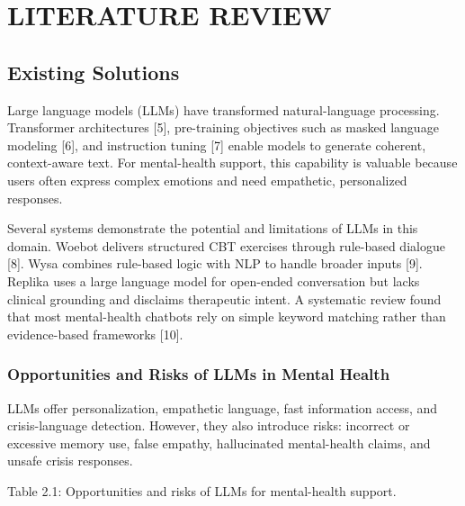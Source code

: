 \documentclass[
  letterpaper,
  12pt,
  a4paper,
  openany]{report}
\begin{document}

\chapter{LITERATURE REVIEW}\label{sec-background}

\section{Existing Solutions}\label{sec-state-of-art}

Large language models (LLMs) have transformed natural-language
processing. Transformer architectures {[}5{]}, pre-training objectives
such as masked language modeling {[}6{]}, and instruction tuning {[}7{]}
enable models to generate coherent, context-aware text. For
mental-health support, this capability is valuable because users often
express complex emotions and need empathetic, personalized responses.

Several systems demonstrate the potential and limitations of LLMs in
this domain. Woebot delivers structured CBT exercises through rule-based
dialogue {[}8{]}. Wysa combines rule-based logic with NLP to handle
broader inputs {[}9{]}. Replika uses a large language model for
open-ended conversation but lacks clinical grounding and disclaims
therapeutic intent. A systematic review found that most mental-health
chatbots rely on simple keyword matching rather than evidence-based
frameworks {[}10{]}.

\subsection{Opportunities and Risks of LLMs in Mental
Health}\label{opportunities-and-risks-of-llms-in-mental-health}

LLMs offer personalization, empathetic language, fast information
access, and crisis-language detection. However, they also introduce
risks: incorrect or excessive memory use, false empathy, hallucinated
mental-health claims, and unsafe crisis responses.

Table 2.1: Opportunities and risks of LLMs for mental-health support.
\end{document}
